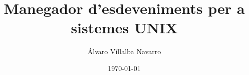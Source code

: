 \documentclass[11pt,final,a4paper]{book}
\title{Manegador d'esdeveniments per a sistemes UNIX}
\author{Álvaro Villalba Navarro}
\date{\today}
\begin{document}
	

\makecovers

\tableofcontents






% 


% 
% 

\nocite{*}


\end{document}
